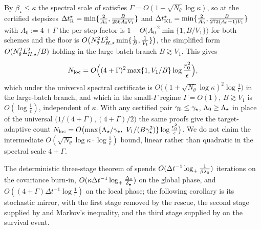 By $\beta_\star\leq\kappa$ the spectral scale of  satisfies
$\Gamma=O(1+\sqrt{N_\theta}\log\kappa)$, so at the certified stepsizes
$\Delta t_{\mathrm{R}}^\star=\min\{\tfrac2{A_0},\tfrac B{256A_0V_1}\}$ and
$\Delta t_{\mathrm{KL}}^\star=\min\{\tfrac2{A_0},\tfrac B{272(A_0+1)V_1}\}$ with $A_0:=4+\Gamma$ the per-step
factor is $1-\Theta\bigl(A_0^{-2}\min\{1,B/V_1\}\bigr)$ for both schemes and the floor is
$O\bigl(N_\theta^2L_{H,\star}^2\min\{\tfrac1B,\tfrac1{V_1}\}\bigr)$, the simplified form
$O(N_\theta^2L_{H,\star}^2/B)$ holding in the large-batch branch $B\gtrsim V_1$. This gives
\[
    N_{\mathrm{loc}}=O\Bigl((4+\Gamma)^2\max\{1,V_1/B\}\log\frac{r_0^2}\epsilon\Bigr),
\]
which under the universal spectral certificate is
$O\bigl((1+\sqrt{N_\theta}\log\kappa)^2\log\tfrac1\epsilon\bigr)$ in the large-batch branch, and which
in the small-$\Gamma$ regime $\Gamma=O(1)$, $B\gtrsim V_1$ is $O(\log\tfrac1\epsilon)$, independent of
$\kappa$. With any certified pair $\gamma_0\leq\gamma_\star$, $\Lambda_0\geq\Lambda_\star$ in place of the universal
$\bigl(1/(4+\Gamma),(4+\Gamma)/2\bigr)$ the same proofs give the target-adaptive count
$N_{\loc}=O\bigl(\max\{\Lstar/\gstar,\ V_1/(B\gstar^2)\}\log\tfrac{r_0^2}\epsilon\bigr)$. We do not
claim the intermediate $O(\sqrt{N_\theta}\log\kappa\cdot\log\tfrac1\epsilon)$ bound, linear rather than
quadratic in the spectral scale $4+\Gamma$.

The deterministic three-stage theorem of  spends
$O(\Delta t^{-1}\log_+\tfrac1{\beta\lambda_0})$ iterations on the covariance burn-in,
$O(\kappa\Delta t^{-1}\log_+\tfrac{\Delta_0}{\delta_\bullet})$ on the global phase, and
$O((4+\Gamma)\Delta t^{-1}\log\tfrac1\epsilon)$ on the local phase; the following corollary is its
stochastic mirror, with the first stage removed by the rescue, the second stage supplied by
 and Markov's inequality, and the third stage supplied by
 on the survival event.

